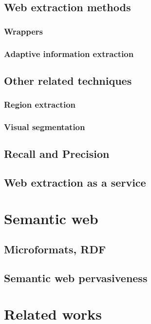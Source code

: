 \subsection{Web extraction methods}
\subsubsection{Wrappers}
\subsubsection{Adaptive information extraction}
\subsection{Other related techniques}
\subsubsection{Region extraction}
\subsubsection{Visual segmentation}
\subsection{Recall and Precision}
\subsection{Web extraction as a service}
\section{Semantic web}
\subsection{Microformats, RDF}
\subsection{Semantic web pervasiveness}
\section{Related works}


